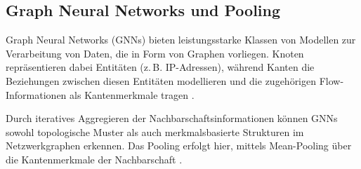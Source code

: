     \subsection{Graph Neural Networks und Pooling}
    Graph Neural Networks (GNNs) bieten leistungsstarke Klassen von Modellen zur Verarbeitung von Daten, die in Form von Graphen vorliegen. Knoten repräsentieren dabei Entitäten (z.\,B. IP-Adressen), während Kanten die Beziehungen zwischen diesen Entitäten modellieren und die zugehörigen Flow-Informationen als Kantenmerkmale tragen \cite{lo2022egraphsage}. 

    Durch iteratives Aggregieren der Nachbarschaftsinformationen können GNNs sowohl topologische Muster als auch merkmalsbasierte Strukturen im Netzwerkgraphen erkennen. Das Pooling erfolgt hier, mittels Mean-Pooling über die Kantenmerkmale der Nachbarschaft \cite{lo2022egraphsage}.
